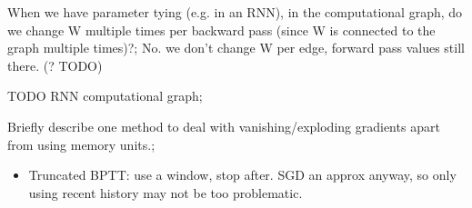 \documentclass{article}
\begin{document}
When we have parameter tying (e.g. in an RNN), in the computational graph, do we change W multiple times per backward pass (since W is connected to the graph multiple times)?; No. we don't change W per edge, forward pass values still there. (? TODO)

TODO RNN computational graph; 

Briefly describe one method to deal with vanishing/exploding gradients apart from using memory units.; \begin{itemize} \item Truncated BPTT: use a window, stop after. SGD an approx anyway, so only using recent history may not be too problematic. \end{itemize}
\end{document}
